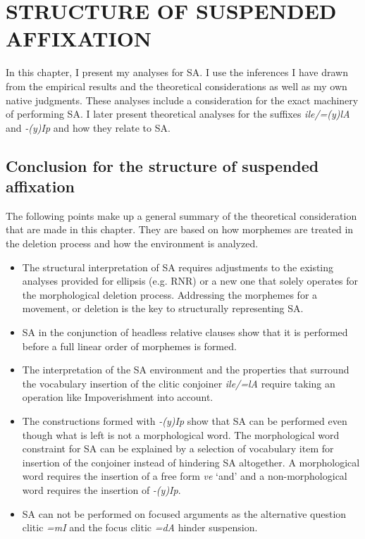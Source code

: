 \chapter{\MakeUppercase{structure of suspended affixation}}


In this chapter, I present my analyses for SA. I use the inferences I have drawn from the empirical results and the theoretical considerations as well as my own native judgments. These analyses include a consideration for the exact machinery of performing SA. I later present theoretical analyses for the suffixes \textit{ile/=(y)lA} and \textit{-(y)Ip} and how they relate to SA.







% 

\section{Conclusion for the structure of suspended affixation}

The following points make up a general summary of the theoretical consideration that are made in this chapter. They are based on how morphemes are treated in the deletion process and how the environment is analyzed. 

\begin{itemize}
    \item The structural interpretation of SA requires adjustments to the existing analyses provided for ellipsis (e.g. RNR) or a new one that solely operates for the morphological deletion process. Addressing the morphemes for a movement, or deletion is the key to structurally representing SA.
    
    \item SA in the conjunction of headless relative clauses show that it is performed before a full linear order of morphemes is formed.
    
    \item The interpretation of the SA environment and the properties that surround the vocabulary insertion of the clitic conjoiner \textit{ile/=lA} require taking an operation like Impoverishment into account.
    
    \item The constructions formed with \textit{-(y)Ip} show that SA can be performed even though what is left is not a morphological word. The morphological word constraint for SA can be explained by a selection of vocabulary item for insertion of the conjoiner instead of hindering SA altogether. A morphological word requires the insertion of a free form \textit{ve} `and' and a non-morphological word requires the insertion of \textit{-(y)Ip}. 
    
    \item SA can not be performed on focused arguments as the alternative question clitic \textit{=mI} and the focus clitic \textit{=dA} hinder suspension.
\end{itemize}


